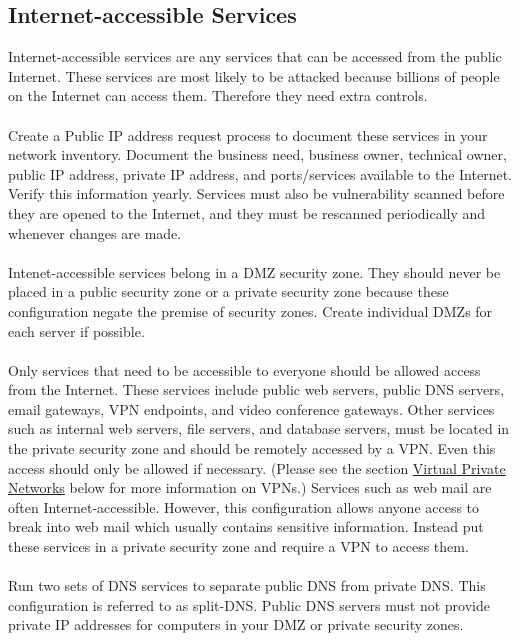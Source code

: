 \label{subsec:"Internet-accessible Services"}\subsection{Internet-accessible Services}
Internet-accessible services are any services that can be accessed from the public Internet. These services are most likely to be attacked because billions of people on the Internet can access them. Therefore they need extra controls.\\\\
Create a Public IP address request process to document these services in your network inventory. Document the business need, business owner, technical owner, public IP address, private IP address, and ports/services available to the Internet. Verify this information yearly. Services must also be vulnerability scanned before they are opened to the Internet, and they must be rescanned periodically and whenever changes are made.\\\\
Intenet-accessible services belong in a DMZ security zone. They should never be placed in a public security zone or a private security zone because these configuration negate the premise of security zones. Create individual DMZs for each server if possible.\\\\
Only services that need to be accessible to everyone should be allowed access from the Internet. These services include public web servers, public DNS servers, email gateways, VPN endpoints, and video conference gateways. Other services such as internal web servers, file servers, and database servers, must be located in the private security zone and should be remotely accessed by a VPN. Even this access should only be allowed if necessary. (Please see the section \hyperref[subsec:"Virtual Private Networks"]{Virtual Private Networks} below for more information on VPNs.) Services such as  web mail are often Internet-accessible. However, this configuration allows anyone access to break into web mail which usually contains sensitive information. Instead put these services in a private security zone and require a VPN to access them.\\\\
Run two sets of DNS services to separate public DNS from private DNS. This configuration is referred to as split-DNS. Public DNS servers must not provide private IP addresses for computers in your DMZ or private security zones.\\\\
